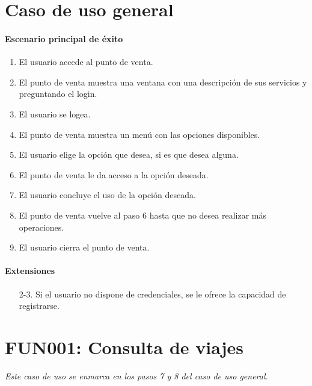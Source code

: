 \section{Caso de uso general}
  \paragraph{Escenario principal de éxito}
  \begin{enumerate}
    \item El usuario accede al punto de venta.
    \item El punto de venta muestra una ventana con una descripción de sus servicios y preguntando el login.
    \item El usuario se logea.
    \item El punto de venta muestra un menú con las opciones disponibles.
    \item El usuario elige la opción que desea, si es que desea alguna.
    \item El punto de venta le da acceso a la opción deseada.
    \item El usuario concluye el uso de la opción deseada.
    \item El punto de venta vuelve al paso 6 hasta que no desea realizar más operaciones.
    \item El usuario cierra el punto de venta.
  \end{enumerate}
  \paragraph{Extensiones}
  \begin{enumerate}
    \item[2-3.] Si el usuario no dispone de credenciales, se le ofrece la capacidad de registrarse.
  \end{enumerate}

\section{FUN001: Consulta de viajes}
  \emph{Este caso de uso se enmarca en los pasos 7 y 8 del caso de uso general.}
